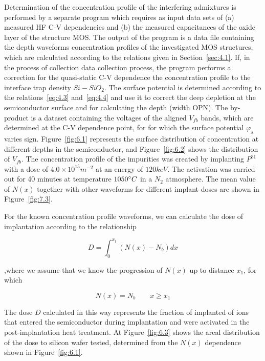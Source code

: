 Determination of the concentration profile of the interfering
admixtures is performed by a separate program which requires as input
data sets of (a) measured HF C-V dependencies and (b) the measured
capacitances of the oxide layer of the structure MOS\@. The output of
the program is a data file containing the depth waveforms
concentration profiles of the investigated MOS structures, which are
calculated according to the relations given in
Section~\ref{sec:4.1}. If, in the process of collection data
collection process, the program performs a correction for the
quasi-static C-V dependence the concentration profile to the interface
trap density $Si-SiO_2$. The surface potential is determined according
to the relations~\ref{eq:4.3} and~\ref{eq:4.4} and use it to correct
the deep depletion at the semiconductor surface and for calculating
the depth (width OPN). The by-product is a dataset containing the
voltages of the aligned $V_{fb}$ bands, which are determined at the
C-V dependence point, for for which the surface potential $\varphi_s$
varies sign. Figure~\ref{fig:6.1} represents the surface distribution
of concentration at different depths in the semiconductor, and
Figure~\ref{fig:6.2} shows the distribution of $V_{fb}$. The
concentration profile of the impurities was created by implanting
$P^{31}$ with a dose of $4.0 \times 10^{15} m^{-2}$ at an energy of
$120 keV$. The activation was carried out for 40 minutes at
temperature $1050 \degree C$ in a $N_2$ atmosphere. The mean value of
$N(x)$ together with other waveforms for different implant doses are
shown in Figure~\ref{fig:7.3}.

For the known concentration profile waveforms, we can calculate the
dose of implantation according to the relationship

\begin{equation}\label{eq:6.1}
  D = \int_{0}^{x_{1}}(N(x) - N_{b}) dx
\end{equation}

,where we assume that we know the progression of $N(x)$ up to distance
$x_{1}$, for which

\begin{equation}\label{eq:6.2}
  N(x) = N_{b} \qquad {x \ge x_{1}}
\end{equation}

The dose $D$ calculated in this way represents the fraction of
implanted of ions that entered the semiconductor during implantation
and were activated in the post-implantation heat treatment. At
Figure~\ref{fig:6.3} shows the areal distribution of the dose to
silicon wafer tested, determined from the $N(x)$ dependence shown in
Figure~\ref{fig:6.1}.

